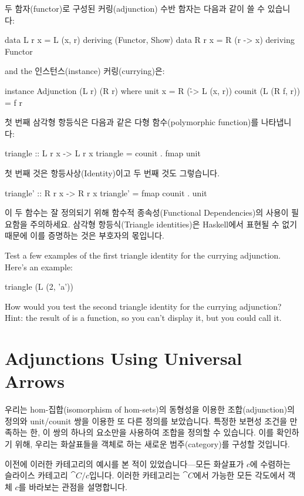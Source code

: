 \documentclass[DaoFP]{subfiles}
\begin{document}
두 함자(functor)로 구성된 커링(adjunction) 수반 함자는 다음과 같이 쓸 수 있습니 다:
\begin{haskell}
data L r x = L (x, r)    deriving (Functor, Show)
data R r x = R (r -> x)  deriving Functor
\end{haskell}
and the  인스턴스(instance) 커링(currying)은:
\begin{haskell}
instance Adjunction (L r) (R r) where
  unit x = R (\r -> L (x, r)) 
  counit (L (R f, r)) = f r
\end{haskell}
첫 번째 삼각형 항등식은 다음과 같은 다형 함수(polymorphic function)를 나타냅니다:
\begin{haskell}
triangle :: L r x -> L r x
triangle = counit . fmap unit
\end{haskell}
첫 번째 것은 항등사상(Identity)이고 두 번째 것도 그렇습니다.
\begin{haskell}
triangle' :: R r x -> R r x
triangle' = fmap counit . unit
\end{haskell}
이 두 함수는 잘 정의되기 위해 함수적 종속성(Functional Dependencies)의 사용이 필요함을 주의하세요. 삼각형 항등식(Triangle identities)은 Haskell에서 표현될 수 없기 때문에 이를 증명하는 것은 부호자의 몫입니다.
\begin{exercise}
Test a few examples of the first triangle identity for the currying adjunction. Here's an example:
\begin{haskell}
triangle (L (2, 'a'))
\end{haskell}
\end{exercise}

\begin{exercise}
How would you test the second triangle identity for the currying adjunction? Hint: the result of  is a function, so you can't display it, but you could call it.
\end{exercise}

\section{Adjunctions Using Universal Arrows}

우리는 hom-집합(isomorphism of hom-sets)의 동형성을 이용한 조합(adjunction)의 정의와 unit/counit 쌍을 이용한 또 다른 정의를 보았습니다. 특정한 보편성 조건을 만족하는 한, 이 쌍의 하나의 요소만을 사용하여 조합을 정의할 수 있습니다. 이를 확인하기 위해, 우리는 화살표들을 객체로 하는 새로운 범주(category)를 구성할 것입니다.

이전에 이러한 카테고리의 예시를 본 적이 있었습니다---모든 화살표가 $c$에 수렴하는 슬라이스 카테고리 $\cat C/ c$입니다. 이러한 카테고리는 $\cat C$에서 가능한 모든 각도에서 객체 $c$를 바라보는 관점을 설명합니다.
\end{document}
